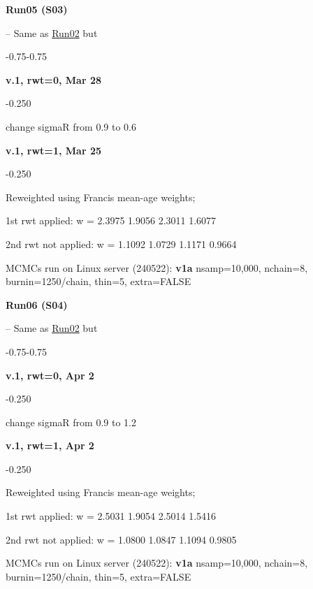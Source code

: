 \hypertarget{R05}{\textbf{Run05 (S03)}} -- Same as \hyperlink{R02}{Run02} but
\begin{itemize_csas}{-0.75}{-0.75}
	\item \textbf{v.1, rwt=0, Mar 28}
	\begin{itemize_csas}{-0.25}{0}
		\item change sigmaR from 0.9 to 0.6
	\end{itemize_csas}
	\item \textbf{v.1, rwt=1, Mar 25}
	\begin{itemize_csas}{-0.25}{0}
		\item Reweighted using Francis mean-age weights;
		\item 1st rwt applied: w = 2.3975  1.9056  2.3011  1.6077
		\item 2nd rwt not applied: w = 1.1092  1.0729  1.1171  0.9664
		\item MCMCs run on Linux server (240522): \textbf{v1a} nsamp=10,000, nchain=8, burnin=1250/chain, thin=5, extra=FALSE
	\end{itemize_csas}
\end{itemize_csas}

\hypertarget{R06}{\textbf{Run06 (S04)}} -- Same as \hyperlink{R02}{Run02} but
\begin{itemize_csas}{-0.75}{-0.75}
	\item \textbf{v.1, rwt=0, Apr 2}
	\begin{itemize_csas}{-0.25}{0}
		\item change sigmaR from 0.9 to 1.2
	\end{itemize_csas}
	\item \textbf{v.1, rwt=1, Apr 2}
	\begin{itemize_csas}{-0.25}{0}
		\item Reweighted using Francis mean-age weights;
		\item 1st rwt applied: w = 2.5031  1.9054  2.5014  1.5416
		\item 2nd rwt not applied: w = 1.0800 1.0847 1.1094 0.9805
		\item MCMCs run on Linux server (240522): \textbf{v1a} nsamp=10,000, nchain=8, burnin=1250/chain, thin=5, extra=FALSE
	\end{itemize_csas}
\end{itemize_csas}

